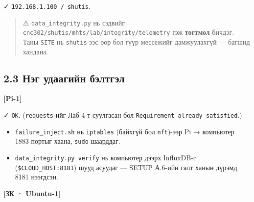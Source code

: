✓ \texttt{192.\allowbreak{}168.\allowbreak{}1.\allowbreak{}100\ /\allowbreak{}\ shutis}.

\begin{quote}
⚠ \texttt{data\_\allowbreak{}integrity.\allowbreak{}py} нь сэдвийг \texttt{cnc302/\allowbreak{}shutis/\allowbreak{}mhts/\allowbreak{}lab/\allowbreak{}integrity/\allowbreak{}telemetry} гэж \textbf{тогтмол} бичдэг. Таны \texttt{SITE} нь \texttt{shutis}-ээс өөр бол гүүр мессежийг дамжуулахгүй --- багшид хандана.
\end{quote}

\hypertarget{ux43dux44dux433-ux443ux434ux430ux430ux433ux438ux439ux43d-ux431ux44dux43bux442ux433ux44dux43b}{%
\subsection{2.3 Нэг удаагийн бэлтгэл}\label{ux43dux44dux433-ux443ux434ux430ux430ux433ux438ux439ux43d-ux431ux44dux43bux442ux433ux44dux43b}}

\textbf{{[}Pi-1{]}}

\begin{Shaded}
\begin{Highlighting}[]
 
  
\end{Highlighting}
\end{Shaded}

✓ \texttt{OK}. (\texttt{requests}-ийг Лаб 4-т суулгасан бол \texttt{Requirement\ already\ satisfied}.)

\begin{itemize}
\tightlist
\item
  \texttt{failure\_\allowbreak{}inject.\allowbreak{}sh} нь \texttt{iptables} (байхгүй бол \texttt{nft})-ээр Pi → компьютер 1883 портыг хаана, \texttt{sudo} шаарддаг.
\item
  \texttt{data\_\allowbreak{}integrity.\allowbreak{}py\ verify} нь компьютер дээрх InfluxDB-г (\texttt{\$CLOUD\_\allowbreak{}HOST:\allowbreak{}8181}) шууд асуудаг --- SETUP А.6-ийн галт ханын дүрэмд 8181 нээгдсэн.
\end{itemize}

\textbf{{[}ЗК · Ubuntu-1{]}}


